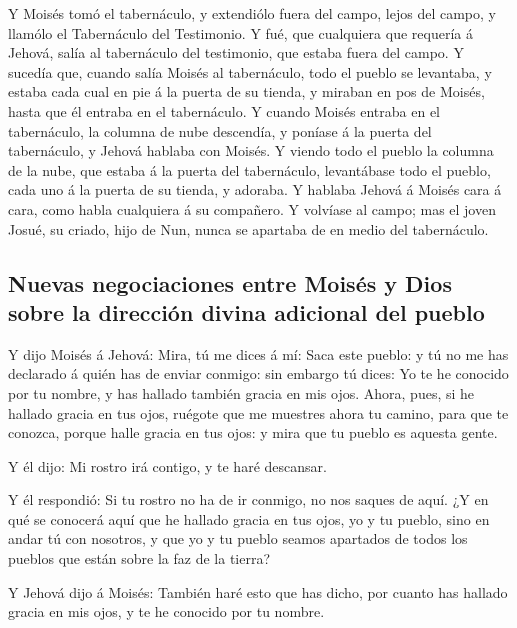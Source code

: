  Y Moisés tomó el tabernáculo, y extendiólo fuera del campo,
lejos del campo, y llamólo el Tabernáculo del Testimonio. Y fué, que
cualquiera que requería á Jehová, salía al tabernáculo del testimonio,
que estaba fuera del campo.  Y sucedía que, cuando salía
Moisés al tabernáculo, todo el pueblo se levantaba, y estaba cada cual
en pie á la puerta de su tienda, y miraban en pos de Moisés, hasta que
él entraba en el tabernáculo.  Y cuando Moisés entraba en el
tabernáculo, la columna de nube descendía, y poníase á la puerta del
tabernáculo, y Jehová hablaba con Moisés.  Y viendo todo el
pueblo la columna de la nube, que estaba á la puerta del tabernáculo,
levantábase todo el pueblo, cada uno á la puerta de su tienda, y
adoraba.  Y hablaba Jehová á Moisés cara á cara, como habla
cualquiera á su compañero. Y volvíase al campo; mas el joven Josué, su
criado, hijo de Nun, nunca se apartaba de en medio del tabernáculo.

\hypertarget{nuevas-negociaciones-entre-moisuxe9s-y-dios-sobre-la-direcciuxf3n-divina-adicional-del-pueblo}{%
\subsection{Nuevas negociaciones entre Moisés y Dios sobre la dirección
divina adicional del
pueblo}\label{nuevas-negociaciones-entre-moisuxe9s-y-dios-sobre-la-direcciuxf3n-divina-adicional-del-pueblo}}

 Y dijo Moisés á Jehová: Mira, tú me dices á mí: Saca este
pueblo: y tú no me has declarado á quién has de enviar conmigo: sin
embargo tú dices: Yo te he conocido por tu nombre, y has hallado también
gracia en mis ojos.  Ahora, pues, si he hallado gracia en
tus ojos, ruégote que me muestres ahora tu camino, para que te conozca,
porque halle gracia en tus ojos: y mira que tu pueblo es aquesta gente.

 Y él dijo: Mi rostro irá contigo, y te haré descansar.

 Y él respondió: Si tu rostro no ha de ir conmigo, no nos
saques de aquí.  ¿Y en qué se conocerá aquí que he hallado
gracia en tus ojos, yo y tu pueblo, sino en andar tú con nosotros, y que
yo y tu pueblo seamos apartados de todos los pueblos que están sobre la
faz de la tierra?

 Y Jehová dijo á Moisés: También haré esto que has dicho,
por cuanto has hallado gracia en mis ojos, y te he conocido por tu
nombre.

